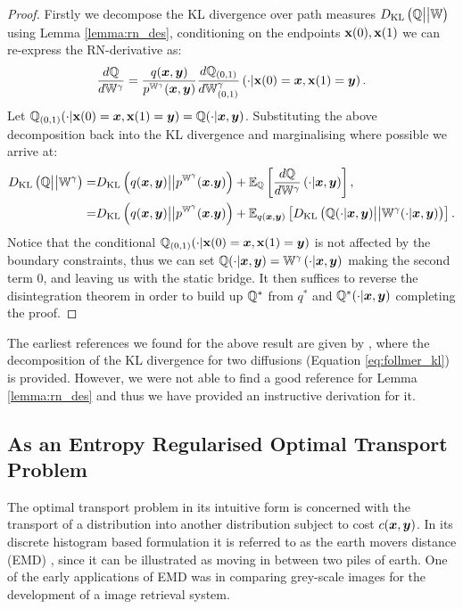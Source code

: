 \documentclass[a4paper,12pt,twoside,openright]{report}
\theoremstyle{definition}
\begin{document}
\begin{proof}
Firstly we decompose the KL divergence over path measures $D_{\mathrm{KL}}\left({\mathbb{Q}} \big|\big| \mathbb{W}\right)$ using Lemma \ref{lemma:rn_des}, conditioning on the endpoints ${\mathbf{x}}(0), {\mathbf{x}}(1)$ we can re-express the RN-derivative as:
\begin{align}
    \frac{d{\mathbb{Q}}}{d\mathbb{W}^\gamma} = \frac{q({\bm{x}}, {\bm{y}})}{p^{\mathbb{W}^{\gamma}}({\bm{x}}, {\bm{y}})}\frac{d{\mathbb{Q}}_{(0,1)}}{d\mathbb{W}_{(0,1)}^\gamma}\left(\cdot | {\mathbf{x}}(0) ={\bm{x}}, {\mathbf{x}}(1) ={\bm{y}}\right).
\end{align}
Let ${\mathbb{Q}}_{(0,1)}(\cdot |  {\mathbf{x}}(0) ={\bm{x}}, {\mathbf{x}}(1) ={\bm{y}}) = {\mathbb{Q}}(\cdot |  {\bm{x}},{\bm{y}})$. Substituting the above decomposition back into the KL divergence and marginalising where possible we arrive at: 
\begin{align} \label{eq:follmer_kl}
    D_{\mathrm{KL}}\left({\mathbb{Q}} \big|\big| \mathbb{W}^{\gamma}\right) =&  D_{\mathrm{KL}}\left(q({\bm{x}}, {\bm{y}}) \big|\big| p^{\mathbb{W}^{\gamma}}({\bm{x}}. {\bm{y}}) \right)  + \mathbb{E}_{{\mathbb{Q}}}\left[\frac{d{\mathbb{Q}}}{d\mathbb{W}^\gamma}\left(\cdot | {\bm{x}}, {\bm{y}}\right)\right], \nonumber \\
    =&  D_{\mathrm{KL}}\left(q({\bm{x}}, {\bm{y}}) \big|\big| p^{\mathbb{W}^{\gamma}}({\bm{x}}. {\bm{y}}) \right)  + \mathbb{E}_{q({\bm{x}},{\bm{y}})}\left[D_{\mathrm{KL}}\left({\mathbb{Q}}(\cdot |  {\bm{x}},{\bm{y}})\big|\big|\mathbb{W}^{\gamma}(\cdot |  {\bm{x}},{\bm{y}})\right)\right].
\end{align}
Notice that the conditional ${\mathbb{Q}}_{(0,1)}(\cdot |  {\mathbf{x}}(0) ={\bm{x}}, {\mathbf{x}}(1) ={\bm{y}})$ is not affected by the boundary constraints, thus we can set ${\mathbb{Q}}(\cdot | {\bm{x}},{\bm{y}}) = \mathbb{W}^\gamma\left(\cdot | {\bm{x}}, {\bm{y}}\right)$ making the second term 0, and leaving us with the static bridge. It then suffices to reverse the disintegration theorem in order to build up ${\mathbb{Q}}^{*}$ from $q^{*}$ and ${\mathbb{Q}}^{*}(\cdot | {\bm{x}},{\bm{y}})$ completing the proof.
\end{proof}

The earliest references we found for the above result are given by \cite{follmer1988random}, where the decomposition of the KL divergence for two diffusions (Equation \ref{eq:follmer_kl}) is provided. However, we were not able to find a good reference for Lemma \ref{lemma:rn_des} and thus we have provided an instructive derivation for it.
\subsection{As an Entropy Regularised Optimal Transport Problem}

The optimal transport problem in its intuitive form is concerned with the transport of a distribution into another distribution subject to cost $c({\bm{x}},{\bm{y}})$. In its discrete histogram based formulation it is referred to as the earth movers distance (EMD) \citep{levina2001earth}, since it can be illustrated as moving in between two piles of earth. One of the early applications of EMD was in comparing grey-scale images for the development of a image retrieval system. 
\end{document}
